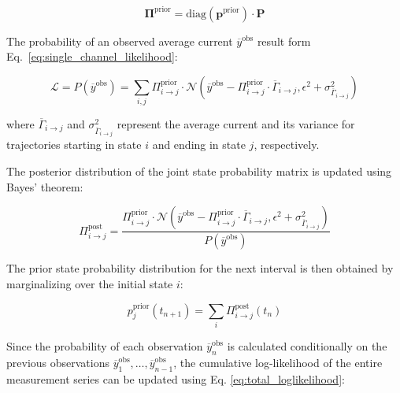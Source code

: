 \documentclass[pdflatex,sn-mathphys-num]{sn-jnl}%
\theoremstyle{thmstyleone}%
\theoremstyle{thmstyletwo}%
\theoremstyle{thmstylethree}%
\begin{document}
\begin{equation}
	\boldsymbol{\Pi}^{\text{prior}} = \mathrm{diag}(\boldsymbol{p}^{\text{prior}}) \cdot \mathbf{P}
	\label{eq:joint_state_probability_matrix}
\end{equation}

The probability of an observed average current \( \overline{y}^{\text{obs}} \) result form Eq.~\ref{eq:single_channel_likelihood}:

\begin{equation}
	\mathcal{L}=P(\overline{y}^{\text{obs}}) = \sum_{i, j} \Pi_{i \rightarrow j}^{\text{prior}} \cdot \mathcal{N}\left(\overline{y}^{\text{obs}} - \Pi_{i \rightarrow j}^{\text{prior}} \cdot \overline{\Gamma}_{i \rightarrow j}, \epsilon^2 + \sigma^2_{\overline{\Gamma}_{i \rightarrow j}}\right)
	\label{eq:single_channel_integrated_likelihood}
\end{equation}

where \( \overline{\Gamma}_{i \rightarrow j} \) and \( \sigma^2_{\overline{\Gamma}_{i \rightarrow j}} \) represent the average current and its variance for trajectories starting in state \( i \) and ending in state \( j \), respectively.

The posterior distribution of the joint state probability matrix is updated using Bayes' theorem:

\begin{equation}
	\Pi_{i \rightarrow j}^{\text{post}} = \frac{\Pi_{i \rightarrow j}^{\text{prior}} \cdot \mathcal{N}\left(\overline{y}^{\text{obs}} - \Pi_{i \rightarrow j}^{\text{prior}} \cdot \overline{\Gamma}_{i \rightarrow j}, \epsilon^2 + \sigma^2_{\overline{\Gamma}_{i \rightarrow j}}\right)}{P(\overline{y}^{\text{obs}})}
	\label{eq:single_channel_integrated_posterior}
\end{equation}

The prior state probability distribution for the next interval is then obtained by marginalizing over the initial state \( i \):

\begin{equation}
	p_j^{\text{prior}}(t_{n+1}) = \sum_i \Pi_{i \rightarrow j}^{\text{post}}(t_n)
	\label{eq:single_channel_integrated_next_prior}
\end{equation}

Since the probability of each observation \( \overline{y}_n^{\text{obs}} \) is calculated conditionally on the previous observations \( \overline{y}_1^{\text{obs}}, \dots, \overline{y}_{n-1}^{\text{obs}} \), the cumulative log-likelihood of the entire measurement series can be updated using Eq. \ref{eq:total_loglikelihood}:
\end{document}
